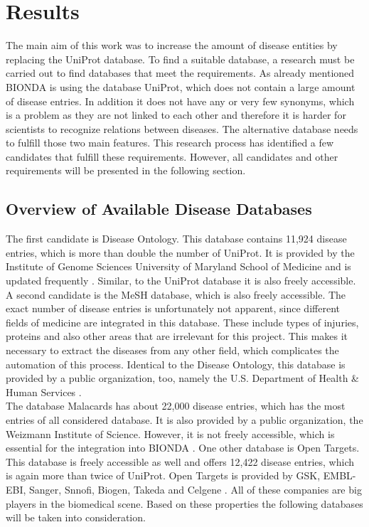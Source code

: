 \chapter{Results}
\label{chapter_results}
The main aim of this work was to increase the amount of disease entities by replacing the \ac{UniProt} database. To find a suitable database, a research must be carried out to find databases that meet the requirements. As already mentioned \ac{BIONDA} is using the database \ac{UniProt}, which does not contain a large amount of disease entries. In addition it does not have any or very few synonyms, which is a problem as they are not linked to each other and therefore it is harder for scientists to recognize relations between diseases. The alternative database needs to fulfill those two main features. This research process has identified a few candidates that fulfill these requirements. However, all candidates and other requirements will be presented in the following section.

\section{Overview of Available Disease Databases}
The first candidate is Disease Ontology. This database contains 11,924 disease entries, which is more than double the number of \ac{UniProt}. It is provided by the Institute of Genome Sciences University of Maryland School of Medicine and is updated frequently \citep{noauthor_disease_nodate}. Similar, to the \ac{UniProt} database it is also freely accessible. A second candidate is the \ac{MeSH} database, which is also freely accessible. The exact number of disease entries is unfortunately not apparent, since different fields of medicine are integrated in this database. These include types of injuries, proteins and also other areas that are irrelevant for this project. This makes it necessary to extract the diseases from any other field, which complicates the automation of this process. Identical to the Disease Ontology, this database is provided by a public organization, too, namely the U.S. Department of Health \& Human Services \citep{noauthor_mesh_nodate}. \\

The database Malacards has about 22,000 disease entries, which has the most entries of all considered database. It is also provided by a public organization, the Weizmann Institute of Science. However, it is not freely accessible, which is essential for the integration into \ac{BIONDA} \citep{noauthor_malacards_nodate}. One other database is Open Targets. This database is freely accessible as well and offers 12,422 disease entries, which is again more than twice of \ac{UniProt}. Open Targets is provided by GSK, EMBL-EBI, Sanger, Snnofi, Biogen, Takeda and Celgene \citep{noauthor_opentargets_nodate}. All of these companies are big players in the biomedical scene. Based on these properties the following databases will be taken into consideration. 

